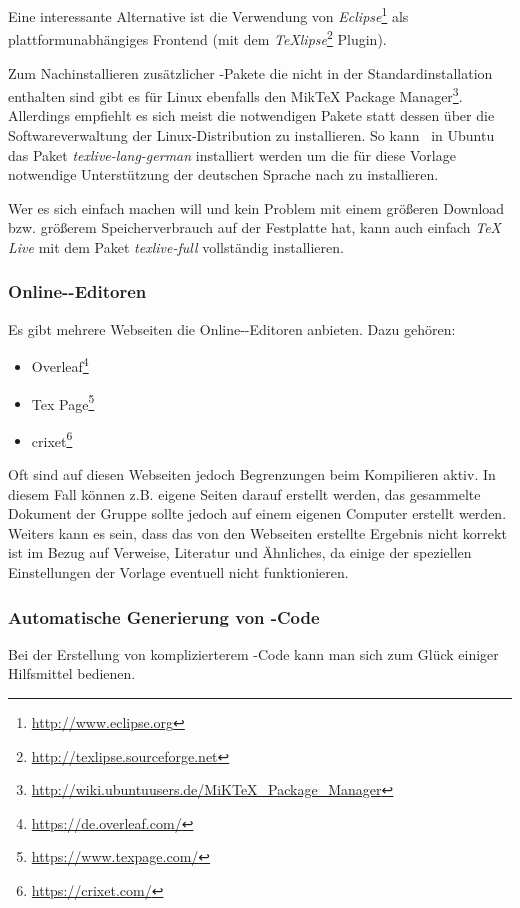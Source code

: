 Eine interessante Alternative ist die Verwendung von
\emph{Eclipse}\footnote{\url{http://www.eclipse.org}} als plattformunabhängiges Frontend 
(mit dem \emph{TeXlipse}\footnote{\url{http://texlipse.sourceforge.net}}
Plugin).


Zum Nachinstallieren zusätzlicher \latex-Pakete die nicht in der
Standardinstallation enthalten sind gibt es für Linux ebenfalls den MikTeX
Package Manager\footnote{\url{http://wiki.ubuntuusers.de/MiKTeX_Package_Manager}}. Allerdings empfiehlt es sich meist die notwendigen Pakete statt dessen über die Softwareverwaltung der Linux-Distribution zu installieren. So kann \zB\ in Ubuntu das Paket \emph{texlive-lang-german} installiert werden um die für diese Vorlage notwendige Unterstützung der deutschen Sprache nach zu installieren.


Wer es sich einfach machen will und kein Problem mit einem größeren Download bzw. größerem Speicherverbrauch auf der Festplatte hat, kann auch einfach \emph{TeX Live} mit dem Paket \emph{texlive-full} vollständig installieren.

\subsubsection{Online-\latex-Editoren}

Es gibt mehrere Webseiten die Online-\latex-Editoren anbieten. Dazu gehören:
\begin{itemize}
	\item Overleaf\footnote{\url{https://de.overleaf.com/}}
	\item Tex Page\footnote{\url{https://www.texpage.com/}}
	\item crixet\footnote{\url{https://crixet.com/}}
\end{itemize}
Oft sind auf diesen Webseiten jedoch Begrenzungen beim Kompilieren aktiv. In diesem Fall können z.B. eigene Seiten darauf erstellt werden, das gesammelte Dokument der Gruppe sollte jedoch auf einem eigenen Computer erstellt werden. Weiters kann es sein, dass das von den Webseiten erstellte Ergebnis nicht korrekt ist im Bezug auf Verweise, Literatur und Ähnliches, da einige der speziellen Einstellungen der Vorlage eventuell nicht funktionieren.

\subsubsection{Automatische Generierung von \latex-Code}
Bei der Erstellung von komplizierterem \latex-Code kann man sich zum Glück
einiger Hilfsmittel bedienen.

